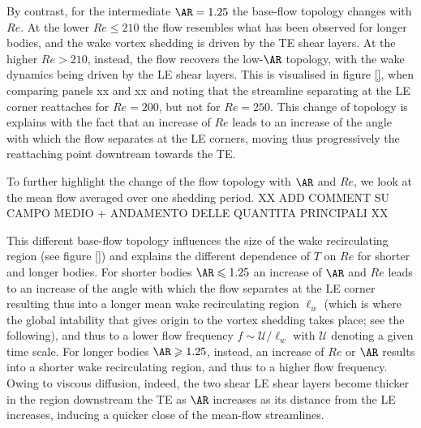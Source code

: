 By contrast, for the intermediate $\AR=1.25$ the base-flow topology changes with $Re$. At the lower $Re \le 210$ the flow resembles what has been observed for longer bodies, and the wake vortex shedding is driven by the TE shear layers. At the higher $Re>210$, instead, the flow recovers the low-$\AR$ topology, with the wake dynamics being driven by the LE shear layers. This is visualised in figure \ref{}, when comparing panels xx and xx and noting that the streamline separating at the LE corner reattaches for $Re=200$, but not for $Re=250$. This change of topology is explains with the fact that an increase of $Re$ leads to an increase of the angle with which the flow separates at the LE corners, moving thus progressively the reattaching point downtream towards the TE.

To further highlight the change of the flow topology with $\AR$ and $Re$, we look at the mean flow averaged over one shedding period. XX ADD COMMENT SU CAMPO MEDIO + ANDAMENTO DELLE QUANTITA PRINCIPALI XX


 This different base-flow topology influences the size of the wake recirculating region (see figure \ref{}) and explains the different dependence of $T$ on $Re$ for shorter and longer bodies. For shorter bodies $\AR \le 1.25$ an increase of $\AR$ and $Re$ leads to an increase of the angle with which the flow separates at the LE corner resulting thus into a longer mean wake recirculating region $\ell_w$ (which is where the global intability that gives origin to the vortex shedding takes place; see the following), and thus to a lower flow frequency $f \sim \mathcal{U}/\ell_w$ with $\mathcal{U}$ denoting a given time scale. For longer bodies $\AR \ge 1.25$, instead, an increase of $Re$ or $\AR$ results into a shorter wake recirculating region, and thus to a higher flow frequency. Owing to viscous diffusion, indeed, the two shear LE shear layers become thicker in the region downstream the TE as $\AR$ increases as its distance from the LE increases, inducing a quicker close of the mean-flow streamlines. 
  
